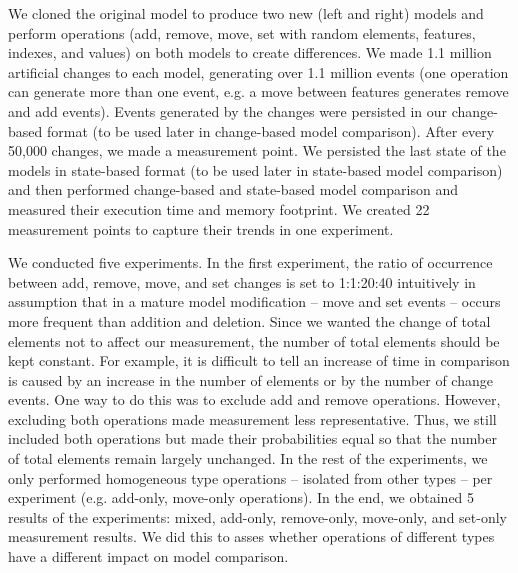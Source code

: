 We cloned the original model to produce two new (left and right) models and perform operations (\textsf{add}, \textsf{remove}, \textsf{move}, \textsf{set} with random elements, features, indexes, and values) on both models to create differences. We made 1.1 million artificial changes to each model, generating over 1.1 million events (one operation can generate more than one event, e.g. a \textsf{move} between features generates \textsf{remove} and \textsf{add} events). Events generated by the changes were persisted in our change-based format (to be used later in change-based model comparison). After every 50,000 changes, we made a measurement point. We persisted the last state of the models in state-based format (to be used later in state-based model comparison) and then performed change-based and state-based model comparison and measured their execution time and memory footprint. We created 22 measurement points to capture their trends in one experiment. 

We conducted five experiments.
In the first experiment, the ratio of occurrence between \textsf{add}, \textsf{remove}, \textsf{move}, and \textsf{set} changes is set to 1:1:20:40 intuitively in assumption that in a mature model modification -- \textsf{move} and \textsf{set} events -- occurs more frequent than addition and deletion. Since we wanted the change of total elements not to affect our measurement, the number of total elements should be kept constant. For example, it is difficult to tell an increase of time in comparison is caused by an increase in the number of elements or by the number of change events. One way to do this was to exclude \textsf{add} and \textsf{remove} operations. However, excluding both operations made measurement less representative. Thus, we still included both operations but made their probabilities equal so that the number of total elements remain largely unchanged. In the rest of the experiments,
we only performed homogeneous type operations -- isolated from other types -- per experiment (e.g. add-only, move-only operations). In the end, we obtained 5 results of the experiments: mixed, add-only, remove-only, move-only, and set-only measurement results. We did this to asses whether operations of different types have a different impact on model comparison.

